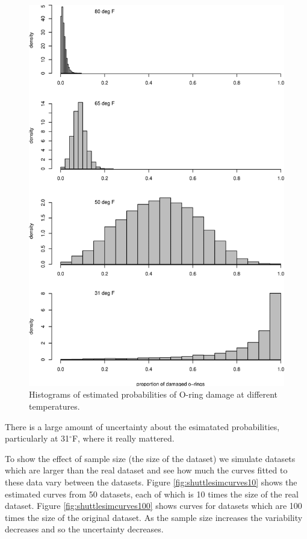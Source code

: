\documentclass[
  british,
]{book}
\begin{document}
\begin{figure}

{\centering \includegraphics[width=0.8\linewidth]{images/shuttle_sim} 

}

\caption{Histograms of estimated probabilities of O-ring damage at different temperatures.}\label{fig:shuttlesim}
\end{figure}

There is a large amount of uncertainty about the esimatated probabilities, particularly at 31\(^\circ\)F, where it really mattered.

To show the effect of sample size (the size of the dataset) we simulate datasets which are larger than the real dataset and see how much the curves fitted to these data vary between the datasets. Figure \ref{fig:shuttlesimcurves10} shows the estimated curves from 50 datasets, each of which is 10 times the size of the real dataset. Figure \ref{fig:shuttlesimcurves100} shows curves for datasets which are 100 times the size of the original dataset. As the sample size increases the variability decreases and so the uncertainty decreases.
\end{document}
